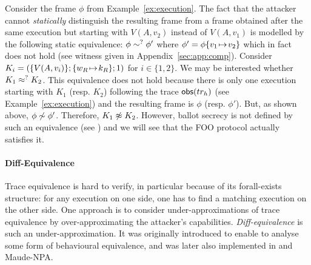\begin{example}%
\label{ex:eint}
Consider the frame $\phi$ from Example~\ref{ex:execution}.
The fact that the attacker cannot {\em statically} distinguish the
resulting frame from a frame obtained after the same execution
but starting with $V(A,v_2)$ instead of $V(A,v_1)$ is modelled by the following
static equivalence:
$\phi\sim^? \phi'$ where $\phi'=\phi \{v_1\!\mapsto\! v_2\}$
which in fact does not hold (see witness given in
Appendix~\ref{sec:app:comp}).
Consider $K_i=(\{V(A,v_i)\};\{w_R\!\mapsto\! k_R\};1)$ for $i\in\{1,2\}$.
We may be interested whether $K_1\approx^? K_2$.
This equivalence does not hold because there is only
one execution starting with $K_1$ (resp. $K_2$) following the trace $\mathsf{obs}(tr_h)$ (see Example~\ref{ex:execution})
and the resulting frame is $\phi$
(resp. $\phi'$).
But, as shown above, $\phi\not\sim \phi'$.
Therefore, $K_1\not\approx K_2$. However, ballot secrecy is not defined
by such an equivalence %
(see ) and we will see that
the FOO protocol actually satisfies it.
\end{example}


\paragraph{\textbf{Diff-Equivalence}}
Trace equivalence is hard to verify, in particular because of its
forall-exists structure: for any execution on one side, one has to find
a matching execution on the other side.
One approach is to consider
under-approximations of trace equivalence by over-approximating the 
attacker's capabilities.
\emph{Diff-equivalence} is such an under-approximation. It
was originally introduced to enable \proverif to analyse some form of
behavioural equivalence, and was later also implemented in \tamarin
and Maude-NPA.


